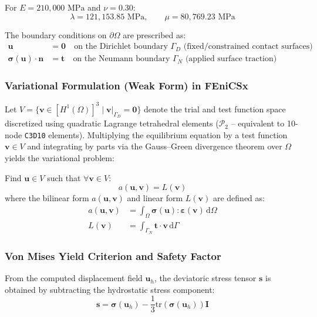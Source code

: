 \documentclass[12pt,a4paper]{article}
\begin{document}
For $E = 210,000\text{ MPa}$ and $\nu = 0.30$:
\begin{equation}
    \lambda = 121,153.85\text{ MPa}, \qquad \mu = 80,769.23\text{ MPa}
\end{equation}

The boundary conditions on $\partial\Omega$ are prescribed as:
\begin{align}
    \mathbf{u} &= \mathbf{0} \quad \text{on the Dirichlet boundary } \Gamma_D \text{ (fixed/constrained contact surfaces)} \\
    \boldsymbol{\sigma}(\mathbf{u}) \cdot \mathbf{n} &= \mathbf{t} \quad \text{on the Neumann boundary } \Gamma_N \text{ (applied surface traction)}
\end{align}

\subsubsection{Variational Formulation (Weak Form) in FEniCSx}
Let $V = \{ \mathbf{v} \in [H^1(\Omega)]^3 \mid \mathbf{v}|_{\Gamma_D} = \mathbf{0} \}$ denote the trial and test function space discretized using quadratic Lagrange tetrahedral elements ($\mathcal{P}_2$ -- equivalent to 10-node \texttt{C3D10} elements). Multiplying the equilibrium equation by a test function $\mathbf{v} \in V$ and integrating by parts via the Gauss--Green divergence theorem over $\Omega$ yields the variational problem:

Find $\mathbf{u} \in V$ such that $\forall \mathbf{v} \in V$:
\begin{equation}
    a(\mathbf{u}, \mathbf{v}) = L(\mathbf{v})
\end{equation}
where the bilinear form $a(\mathbf{u}, \mathbf{v})$ and linear form $L(\mathbf{v})$ are defined as:
\begin{align}
    a(\mathbf{u}, \mathbf{v}) &= \int_\Omega \boldsymbol{\sigma}(\mathbf{u}) : \boldsymbol{\varepsilon}(\mathbf{v}) \, \text{d}\Omega \\
    L(\mathbf{v}) &= \int_{\Gamma_N} \mathbf{t} \cdot \mathbf{v} \, \text{d}\Gamma
\end{align}

\subsubsection{Von Mises Yield Criterion and Safety Factor}
From the computed displacement field $\mathbf{u}_h$, the deviatoric stress tensor $\mathbf{s}$ is obtained by subtracting the hydrostatic stress component:
\begin{equation}
    \mathbf{s} = \boldsymbol{\sigma}(\mathbf{u}_h) - \frac{1}{3} \text{tr}(\boldsymbol{\sigma}(\mathbf{u}_h)) \mathbf{I}
\end{equation}
\end{document}
